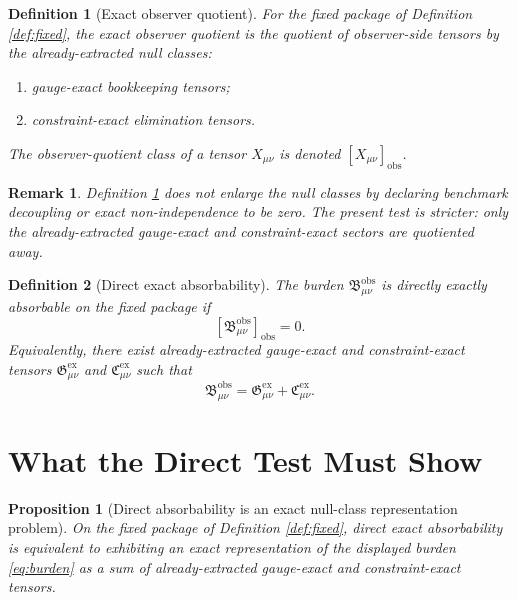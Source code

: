 \documentclass[11pt]{article}
\newcommand{\ObsBurden}{\mathfrak B_{\mu\nu}^{\mathrm{obs}}}
\newcommand{\ObserverClass}[1]{\left[#1\right]_{\mathrm{obs}}}
\newcommand{\GaugeExact}{\mathfrak G_{\mu\nu}^{\mathrm{ex}}}
\newcommand{\ConstraintExact}{\mathfrak C_{\mu\nu}^{\mathrm{ex}}}
\newtheorem{definition}{Definition}
\newtheorem{proposition}{Proposition}
\newtheorem{remark}{Remark}
\begin{document}
\begin{definition}[Exact observer quotient]
\label{def:quot}
For the fixed package of Definition \ref{def:fixed}, the \emph{exact observer quotient} is the quotient of observer-side tensors by the already-extracted null classes:
\begin{enumerate}
    \item gauge-exact bookkeeping tensors;
    \item constraint-exact elimination tensors.
\end{enumerate}
The observer-quotient class of a tensor \(X_{\mu\nu}\) is denoted \(\ObserverClass{X_{\mu\nu}}\).
\end{definition}

\begin{remark}
Definition \ref{def:quot} does not enlarge the null classes by declaring benchmark decoupling or exact non-independence to be zero. The present test is stricter: only the already-extracted gauge-exact and constraint-exact sectors are quotiented away.
\end{remark}

\begin{definition}[Direct exact absorbability]
\label{def:direct}
The burden \(\ObsBurden\) is \emph{directly exactly absorbable} on the fixed package if
\begin{equation}
\ObserverClass{\ObsBurden}=0.
\label{eq:obsvanish}
\end{equation}
Equivalently, there exist already-extracted gauge-exact and constraint-exact tensors \(\GaugeExact\) and \(\ConstraintExact\) such that
\begin{equation}
\ObsBurden=\GaugeExact+\ConstraintExact.
\label{eq:direct}
\end{equation}
\end{definition}

\section{What the Direct Test Must Show}

\begin{proposition}[Direct absorbability is an exact null-class representation problem]
\label{prop:repr}
On the fixed package of Definition \ref{def:fixed}, direct exact absorbability is equivalent to exhibiting an exact representation of the displayed burden \eqref{eq:burden} as a sum of already-extracted gauge-exact and constraint-exact tensors.
\end{proposition}
\end{document}

